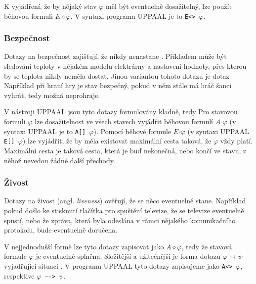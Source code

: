 K vyjádření, že by nějaký stav $\varphi$ měl být eventuelně dosažitelný, lze použít běhovou formuli $E \diamond \varphi$. V syntaxi programu UPPAAL je to \texttt{E<> $\varphi$}.

\subsubsection{Bezpečnost}
Dotazy na bezpečnost zajišťují, že nikdy nenastane . Příkladem může být sledování teploty v nějakém modelu elektrárny a nastavení hodnoty, přes kterou by se teplota nikdy neměla dostat. Jinou variantou tohoto dotazu je dotaz  Například při hraní hry je stav bezpečný, pokud v něm stále má hráč šanci vyhrát, tedy možná neprohraje.

V nástroji UPPAAL jsou tyto dotazy formulovány kladně, tedy  Pro stavovou formuli $\varphi$ lze dosažitelnost ve všech stavech vyjádřit běhovou formulí $A \square \varphi$ (v syntaxi UPPAAL je to \texttt{A[] $\varphi$}). Pomocí běhové formule $E \square \varphi$ (v syntaxi UPPAAL \texttt{E[] $\varphi$}) lze vyjádřit, že by měla existovat maximální cesta taková, že $\varphi$ vždy platí. Maximální cesta je taková cesta, která je buď nekonečná, nebo končí ve stavu, z něhož nevedou žádné další přechody.

\subsubsection{Živost}
Dotazy na živost (angl. \textit{liveness}) ověřují, že se něco eventuelně stane. Například pokud došlo ke stisknutí tlačítka pro spuštění televize, že se televize eventuelně spustí, nebo že zpráva, která byla odeslána v rámci nějakého komunikačního protokolu, bude eventuelně doručena.

V nejjednodušší formě lze tyto dotazy zapisovat jako $A \diamond \varphi$, tedy že stavová formule $\varphi$ je eventuelně splněna. Složitější a užitečnější je forma dotazu $\varphi \rightsquigarrow \psi$ vyjadřující situaci . V programu UPPAAL tyto dotazy zapisujeme jako \texttt{A<> $\varphi$}, respektive \texttt{$\varphi$ ----> $\psi$}.

